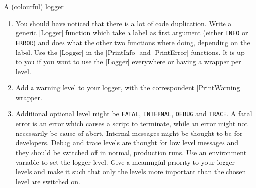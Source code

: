 \begin{exercise}[Inspirational]{A (colourful) logger}
\begin{enumerate}
{              }
        \item You should have noticed that there is a lot of code duplication.
              Write a generic \bash|Logger| function which take a label as first argument (either \texttt{INFO} or \texttt{ERROR}) and does what the other two functions where doing, depending on the label.
              Use the \bash|Logger| in the \bash|PrintInfo| and \bash|PrintError| functions.
              It is up to you if you want to use the \bash|Logger| everywhere or having a wrapper per level.
        \item Add a warning level to your logger, with the correspondent \bash|PrintWarning| wrapper.
        \item Additional optional level might be \texttt{FATAL}, \texttt{INTERNAL}, \texttt{DEBUG} and \texttt{TRACE}.
              A fatal error is an error which causes a script to terminate, while an error might not necessarily be cause of abort.
              Internal messages might be thought to be for developers.
              Debug and trace levels are thought for low level messages and they should be switched off in normal, production runs.
              Use an environment variable to set the logger level.
              Give a meaningful priority to your logger levels and make it such that only the levels more important than the chosen level are switched on.
    \end{enumerate}
\end{exercise}

